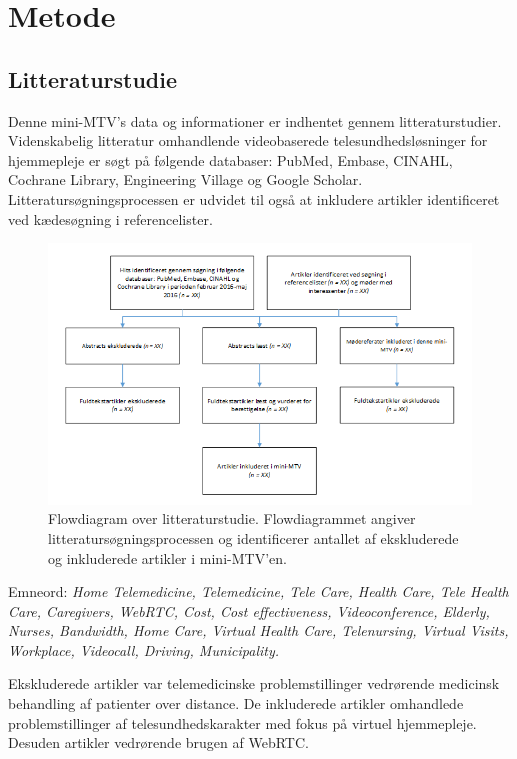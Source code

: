 \chapter{Metode}\label{chap:metode}

\section{Litteraturstudie}
Denne mini-MTV's data og informationer er indhentet gennem litteraturstudier. Videnskabelig litteratur omhandlende videobaserede telesundhedsløsninger for hjemmepleje er søgt på følgende databaser: PubMed, Embase, CINAHL, Cochrane Library, Engineering Village og Google Scholar. Litteratursøgningsprocessen er udvidet til også at inkludere artikler identificeret ved kædesøgning i referencelister.

\begin{figure}[H]
\centering
\includegraphics[width=1\textwidth]{Figurer/metode_flow.png}
\caption{\label{fig:metodeflow}Flowdiagram over  litteraturstudie. Flowdiagrammet angiver litteratursøgningsprocessen og identificerer antallet af ekskluderede og inkluderede artikler i mini-MTV'en.}
\end{figure}

Emneord: \textit{Home Telemedicine, Telemedicine, Tele Care, Health Care, Tele Health Care, Caregivers, WebRTC, Cost, Cost effectiveness, Videoconference, Elderly, Nurses, Bandwidth, Home Care, Virtual Health Care, Telenursing, Virtual Visits, Workplace, Videocall, Driving, Municipality.}

Ekskluderede artikler var telemedicinske problemstillinger vedrørende medicinsk behandling af patienter over distance. De inkluderede artikler omhandlede problemstillinger af telesundhedskarakter med fokus på virtuel hjemmepleje. Desuden artikler vedrørende brugen af WebRTC.  

